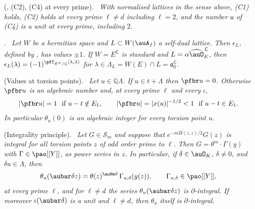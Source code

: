 \documentclass[10pt]{amsart}
\theoremstyle{definition}
\theoremstyle{remark}
\newcommand{\Q}{\mathbb Q}
\newenvironment{quotedthm}[2]{\par\medskip\noindent\begingroup
  \textbf{#1}#2.\ \itshape\ignorespaces}{\endgroup\par\medskip}
\begin{document}
\begin{quotedthm}{\cite[Corollary~7.3]{P49}}{ ({\cite[Proposition~5.25(C1)]{P49}}, (C2), (C4) at every prime)}
With normalised lattices in the sense above, {\rm(C1)} holds, {\rm(C2)} holds at every prime
$\ell\ne d$ including $\ell=2$, and the number $\mathsf u$ of {\rm(C4)} is a unit at every prime,
including $2$.
\end{quotedthm}

\begin{quotedthm}{\cite[Lemma~7.4]{P49}}{}
Let $W$ be a hermitian space and $L\subset W(\auA_f)$ a self-dual lattice. Then $\epsilon_L$,
defined by {\cite[(70)]{P49}}, has values $\pm1$. If $W=E^{\mathsf C}$ is standard and
$L=\alpha\widehat\auO_E^{\,\mathsf C}$, then $\epsilon_L(\lambda)=(-1)^{\pfT_{E^+/\Q}\langle\lambda,
\lambda\rangle}$ for $\lambda\in\Lambda_L=W(E)\cap L=\mathfrak a_0^{\mathsf C}$.
\end{quotedthm}

\begin{quotedthm}{\cite[Proposition~7.5]{P49}}{ (Values at torsion points)}
Let $u\in\Q\Lambda$. If $u\in t+\Lambda$ then $\pfbr u=0$. Otherwise $\pfbr u$ is an algebraic
number and, at every prime $\ell$ and every $\iota$,
\[
|\pfbr u|=1\ \text{ if }u-t\notin E_1,\qquad|\pfbr u|=|x(u)|^{-1/2}<1\ \text{ if }u-t\in E_1 .
\]
In particular $\theta_u(0)$ is an algebraic integer for every torsion point $u$.
\end{quotedthm}

\begin{quotedthm}{\cite[Proposition~7.6]{P49}}{ (Integrality principle)}
Let $G\in\mathcal S_m$ and suppose that $e^{-mH(z,z)/2}G(z)$ is integral for all torsion points $z$
of odd order prime to $\ell$. Then $G=\theta^m\cdot\Gamma(y)$ with $\Gamma\in\pao[[Y]]$, as power
series in $z$. In particular, if $\delta\in\auO_K$, $\delta\ne0$, and $\delta u\in\Lambda$, then
\[
\theta_u(\aubar\delta z)=\theta(z)^{\auNm\delta}\,\Gamma_{u,\delta}(y(z)),\qquad\Gamma_{u,\delta}\in
\pao[[Y]],
\]
at every prime $\ell$, and for $\ell\ne d$ the series $\theta_u(\aubar\delta z)$ is
$\partial$-integral. If moreover $\iota(\aubar\delta)$ is a unit and $\ell\ne d$, then $\theta_u$
itself is $\partial$-integral.
\end{quotedthm}
\end{document}
